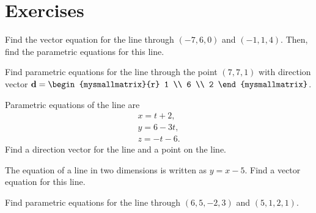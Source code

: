 \section*{Exercises}

\begin{ex}
  Find the vector equation for the line through $(-7,6,0)$ and
  $(-1,1,4)$. Then, find the parametric equations for this
  line.
\end{ex}

\begin{ex}
  Find parametric equations for the line through the point
  $(7,7,1)$ with direction vector
  $\vect{d} = \begin{mysmallmatrix}{r} 1 \\ 6 \\ 2 \end{mysmallmatrix}$.
\end{ex}

\begin{ex}
  Parametric equations of the line are
  \begin{equation*}
    \begin{array}{c}
      x = t+2, \\
      y = 6-3t, \\
      z = -t-6.
    \end{array}
  \end{equation*}
  Find a direction vector for the line and a point on the line.
\end{ex}

\begin{ex}
  The equation of a line in two dimensions is written as $y=x-5$. Find
  a vector equation for this line.
\end{ex}

\begin{ex}
  Find parametric equations for the line through $(6, 5, -2, 3)$
  and $(5, 1, 2, 1)$.
\end{ex}

